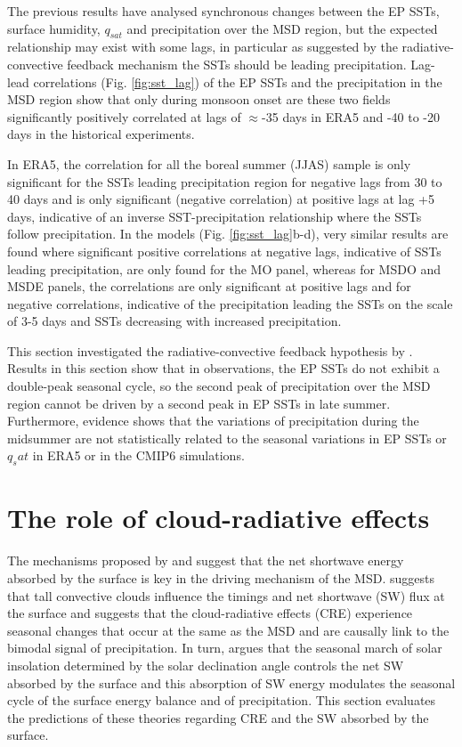 The previous results have analysed synchronous changes between the EP SSTs, surface humidity, $q_{sat}$ and precipitation over the MSD region, but the expected relationship may exist with some lags, in particular as suggested by the radiative-convective feedback mechanism the SSTs should be leading precipitation. 
Lag-lead correlations (Fig. \ref{fig:sst_lag}) of the EP SSTs and the precipitation in the MSD region show that only during monsoon onset are these two fields significantly positively correlated at lags of $\approx$-35 days in ERA5 and -40 to -20 days in the historical experiments. 

In ERA5, the correlation for all the boreal summer (JJAS) sample is only significant for the SSTs leading  precipitation region for negative lags from 30 to 40 days and is only significant (negative correlation) at positive lags at lag +5 days, indicative of an inverse SST-precipitation relationship where the SSTs follow precipitation. 
In the models (Fig. \ref{fig:sst_lag}b-d), very similar results are found where significant positive correlations at negative lags, indicative of SSTs leading precipitation, are only found for the MO panel, whereas for MSDO and MSDE panels, the correlations are only significant at positive lags and for negative correlations, indicative of the precipitation leading the SSTs on the scale of 3-5 days and SSTs decreasing with increased precipitation.

This section investigated the radiative-convective feedback hypothesis by \cite{magana1999}.
Results in this section show that in observations, the EP SSTs do not exhibit a double-peak seasonal cycle, so the second peak of precipitation over the MSD region cannot be driven by a second peak in EP SSTs in late summer. Furthermore, evidence shows that the variations of precipitation during the midsummer are not statistically related to the seasonal variations in EP SSTs or $q_sat$ in ERA5 or in the CMIP6 simulations. 

\section{The role of cloud-radiative effects}

The mechanisms proposed by \cite{magana1999} and \cite{karnauskas2013} suggest that the net shortwave energy absorbed by the surface is key in the driving mechanism of the MSD. \cite{magana1999} suggests that tall convective clouds influence the timings and net shortwave (SW) flux at the surface and suggests that the cloud-radiative effects (CRE) experience seasonal changes that occur at the same as the MSD and are causally link to the bimodal signal of precipitation. 
In turn, \cite{karnauskas2013} argues that the seasonal march of solar insolation determined by the solar declination angle controls the net SW absorbed by the surface and this absorption of SW energy modulates the seasonal cycle of the surface energy balance and of precipitation.
This section evaluates the predictions of these theories regarding CRE and the SW absorbed by the surface. 


